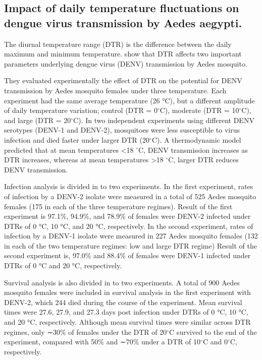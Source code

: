 \documentclass[review]{elsarticle}
\begin{document}
\subsection{Impact of daily temperature fluctuations on dengue virus transmission by Aedes aegypti.}

The diurnal temperature range (DTR) is the difference between the daily maximum and minimum temperature. \cite{lambrechts2011impact} show that DTR affects two important parameters underlying dengue virus (DENV) transmission by Aedes mosquito.

They evaluated experimentally the effect of DTR on the potential for DENV transmission by Aedes mosquito females under three temperature. Each experiment had the same average temperature (26 °C), but a different amplitude of daily temperature variation; control (DTR = 0$^{\circ}$C), moderate (DTR = 10$^{\circ}$C), and large (DTR = 20$^{\circ}$C). In two independent experiments using different DENV serotypes (DENV-1 and DENV-2), mosquitoes were less susceptible to virus infection and died faster under larger DTR (20$^{\circ}$C).  A thermodynamic model predicted that at mean temperatures <18 $^{\circ}$C, DENV transmission increases as DTR increases, whereas at mean temperatures >18 $^{\circ}$C, larger DTR reduces DENV transmission.

Infection analysis is divided in to two experiments. In the first experiment, rates of infection by a DENV-2 isolate were measured in a total of 525 Aedes mosquito females (175 in each of the three temperature regimes). Result of the first experiment is 97.1\%, 94.9\%, and 78.9\% of females were DENV-2 infected under DTRs of 0 °C, 10 °C, and 20 °C, respectively. In the second experiment, rates of infection by a DENV-1 isolate were measured in 227 Aedes mosquito females (132 in each of the two temperature regimes: low and large DTR regime) Result of the second experiment is, 97.0\% and 88.4\% of females were DENV-1 infected under DTRs of 0 °C and 20 °C, respectively.

Survival analysis is also divided in to two experiments. A total of 900 Aedes mosquito females were included in survival analysis in the first experiment with DENV-2, which 244 died during the course of the experiment. Mean survival times were 27.6, 27.9, and 27.3 days post infection under DTRs of 0 °C, 10 °C, and 20 °C, respectively. Although mean survival times were similar across DTR regimes, only ∼30\% of females under the DTR of 20$^{\circ}$C survived to the end of the experiment, compared with 50\% and ∼70\% under a DTR of 10$^{\circ}$C and 0$^{\circ}$C, respectively. 
\end{document}
